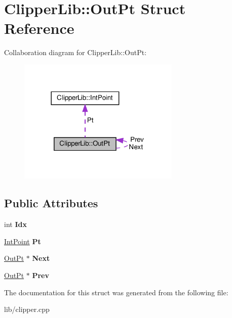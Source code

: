 \hypertarget{struct_clipper_lib_1_1_out_pt}{}\section{Clipper\+Lib\+:\+:Out\+Pt Struct Reference}
\label{struct_clipper_lib_1_1_out_pt}


Collaboration diagram for Clipper\+Lib\+:\+:Out\+Pt\+:
\nopagebreak
\begin{figure}[H]
\begin{center}
\leavevmode
\includegraphics[width=218pt]{struct_clipper_lib_1_1_out_pt__coll__graph}
\end{center}
\end{figure}
\subsection*{Public Attributes}
\begin{DoxyCompactItemize}
\item 
\mbox{\label{struct_clipper_lib_1_1_out_pt_ad04d3691d47a5d0d9b2ae097e7e7bf10}} 
int {\bfseries Idx}
\item 
\mbox{\label{struct_clipper_lib_1_1_out_pt_aa01c2b1e9c5b2d8faa40701178ffcf98}} 
\hyperlink{struct_clipper_lib_1_1_int_point}{Int\+Point} {\bfseries Pt}
\item 
\mbox{\label{struct_clipper_lib_1_1_out_pt_a2d605b87f6da37dbdbef990c4fa5819e}} 
\hyperlink{struct_clipper_lib_1_1_out_pt}{Out\+Pt} $\ast$ {\bfseries Next}
\item 
\mbox{\label{struct_clipper_lib_1_1_out_pt_a609eb414d5764e78150cceccaffc5d54}} 
\hyperlink{struct_clipper_lib_1_1_out_pt}{Out\+Pt} $\ast$ {\bfseries Prev}
\end{DoxyCompactItemize}


The documentation for this struct was generated from the following file\+:\begin{DoxyCompactItemize}
\item 
lib/clipper.\+cpp\end{DoxyCompactItemize}
